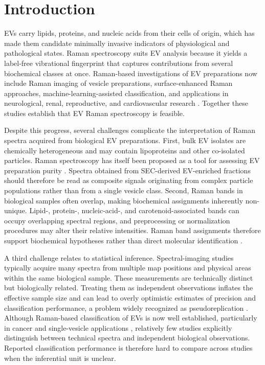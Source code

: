 \documentclass[preprint,12pt]{elsarticle}
\begin{document}
\section{Introduction} 
\label{sec:introduction}

EVs carry lipids, proteins, and nucleic acids from their cells of origin, which has made them candidate minimally invasive indicators of physiological and pathological states. Raman spectroscopy suits EV analysis because it yields a label-free vibrational fingerprint that captures contributions from several biochemical classes at once. Raman-based investigations of EV preparations now include Raman imaging of vesicle preparations, surface-enhanced Raman approaches, machine-learning-assisted classification, and applications in neurological, renal, reproductive, and cardiovascular research \cite{horgan2020, liu2025, koster2021, jensen2024, lee2020, imanbekova2021, kaminska2022, zhang2020, buchan2025}. Together these studies establish that EV Raman spectroscopy is feasible.

Despite this progress, several challenges complicate the interpretation of Raman spectra acquired from biological EV preparations. First, bulk EV isolates are chemically heterogeneous and may contain lipoproteins and other co-isolated particles. Raman spectroscopy has itself been proposed as a tool for assessing EV preparation purity \cite{gualerzi2019}. Spectra obtained from SEC-derived EV-enriched fractions should therefore be read as composite signals originating from complex particle populations rather than from a single vesicle class. Second, Raman bands in biological samples often overlap, making biochemical assignments inherently non-unique. Lipid-, protein-, nucleic-acid-, and carotenoid-associated bands can occupy overlapping spectral regions, and preprocessing or normalization procedures may alter their relative intensities. Raman band assignments therefore support biochemical hypotheses rather than direct molecular identification \cite{czamara2015, dreier2019, hobro2007}.

A third challenge relates to statistical inference. Spectral-imaging studies typically acquire many spectra from multiple map positions and physical areas within the same biological sample. These measurements are technically distinct but biologically related. Treating them as independent observations inflates the effective sample size and can lead to overly optimistic estimates of precision and classification performance, a problem widely recognized as pseudoreplication \cite{hurlbert1984, lazic2010}. Although Raman-based classification of EVs is now well established, particularly in cancer and single-vesicle applications \cite{lee2020,jensen2024}, relatively few studies explicitly distinguish between technical spectra and independent biological observations. Reported classification performance is therefore hard to compare across studies when the inferential unit is unclear.
\end{document}
